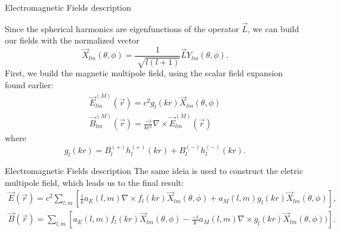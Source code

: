 \documentclass[10pt]{beamer}
\begin{document}

\begin{frame}[fragile]{Electromagnetic Fields description}

Since the spherical harmonics are eigenfunctions of the operator $\vec{L}$, we can build our fields with the normalized vector
      \begin{equation*}
          \vec{X}_{lm}(\theta,\phi)=\frac{1}{\sqrt[]{l(l+1)}}\vec{L}Y_{lm}(\theta,\phi).
      \end{equation*}
First, we build the magnetic multipole field, using the scalar field expansion found earlier:
      \begin{equation*}
      \begin{split}
          \vec{E}_{lm}^{(M)}(\vec{r})=c^2g_l(kr)\vec{X}_{lm}(\theta,\phi)\\
          \vec{B}_{lm}^{(M)}(\vec{r})=\frac{-i}{kc^2}\nabla \times \vec{E}_{lm}^{(M)}(\vec{r})
      \end{split}
      \end{equation*}
where
      \begin{equation*}
          g_l(kr)= B^{(+)}_{l}h^{(+)}_l(kr) + B^{(-)}_{l}h^{(-)}_l(kr).
      \end{equation*}
\end{frame}


\begin{frame}[fragile]{Electromagnetic Fields description}
The same ideia is used to construct the eletric multipole field, which leads us to the final result:
      \begin{equation*}
      \begin{split}
          \vec{E}(\vec{r})=c^2\sum_{l,m}\left[ \frac{i}{k}a_E(l,m)\nabla \times f_l(kr)\vec{X}_{lm}(\theta,\phi) + a_M(l,m)g_l(kr)\vec{X}_{lm}(\theta,\phi)  \right],\\
          \vec{B}(\vec{r})=\sum_{l,m}\left[ a_E(l,m)f_l(kr)\vec{X}_{lm}(\theta,\phi) - \frac{-i}{k} a_M(l,m)\nabla \times g_l(kr)\vec{X}_{lm}(\theta,\phi)) \right].
      \end{split}
      \end{equation*}

\end{frame}

\end{document}
